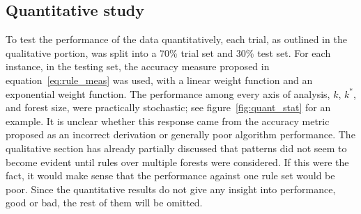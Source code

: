 \documentclass[10pt]{article}
\begin{document}
\subsection{Quantitative study}
To test the performance of the data quantitatively, each trial, as outlined in the qualitative portion, was split into a 70\% trial set and 30\% test set. For each instance, in the testing set, the accuracy measure proposed in equation~\ref{eq:rule_meas} was used, with a linear weight function and an exponential weight function. The performance among every axis of analysis, $k$, $k^*$, and forest size, were practically stochastic; see figure~\ref{fig:quant_stat} for an example. It is unclear whether this response came from the accuracy metric proposed as an incorrect derivation or generally poor algorithm performance. The qualitative section has already partially discussed that patterns did not seem to become evident until rules over multiple forests were considered. If this were the fact, it would make sense that the performance against one rule set would be poor. Since the quantitative results do not give any insight into performance, good or bad, the rest of them will be omitted. 
\end{document}
